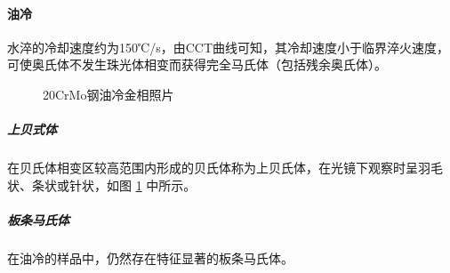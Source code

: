 \documentclass[12pt]{ctexart}
\begin{document}
\paragraph{油冷}
水淬的冷却速度约为150℃/s，由CCT曲线可知，其冷却速度小于临界淬火速度，可使奥氏体不发生珠光体相变而获得完全马氏体（包括残余奥氏体）。
\newpage
\begin{figure}[ht!]
  \centering
  \caption{20CrMo钢油冷金相照片}
  \label{20oil}
\end{figure}
\subparagraph{上贝式体}
在贝氏体相变区较高范围内形成的贝氏体称为上贝氏体，在光镜下观察时呈羽毛状、条状或针状，如图 \ref{20oil} 中所示。
\subparagraph{板条马氏体}
在油冷的样品中，仍然存在特征显著的板条马氏体。
\end{document}
